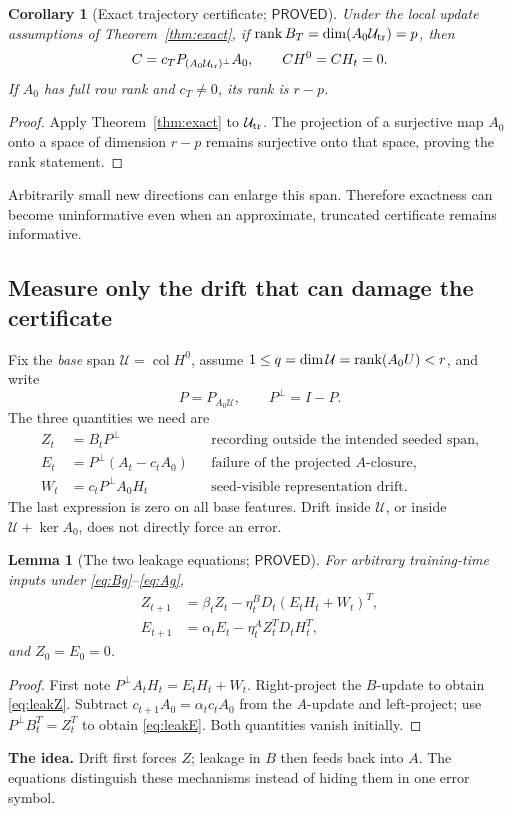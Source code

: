 \documentclass[12pt,a4paper]{article}
\theoremstyle{readable}
\newtheorem{lemma}[theorem]{Lemma}
\newtheorem{corollary}[theorem]{Corollary}
\theoremstyle{definition}\newtheorem{example}[theorem]{Example}
\newcommand{\col}{\operatorname{col}}\newcommand{\row}{\operatorname{row}}
\newcommand{\PP}{\mathsf{PROVED}}\newcommand{\FF}{\mathsf{FALSE}}
\newcommand{\idea}[1]{\par\textbf{The idea.} #1\par}
\begin{document}
\begin{corollary}[Exact trajectory certificate; \(\PP\)]\label{cor:trajectory}
Under the local update assumptions of Theorem~\ref{thm:exact}, if
\(\operatorname{rank} B_T=\dim(A_0\mathcal U_{\rm tr})=p\), then
\[
C=c_TP_{(A_0\mathcal U_{\rm tr})^\perp}A_0,
\qquad CH^0=CH_t=0.
\]
If \(A_0\) has full row rank and \(c_T\ne0\), its rank is \(r-p\).
\end{corollary}
\begin{proof}
Apply Theorem~\ref{thm:exact} to \(\mathcal U_{\rm tr}\). The projection of a surjective map \(A_0\) onto a space of dimension \(r-p\) remains surjective onto that space, proving the rank statement.
\end{proof}
Arbitrarily small new directions can enlarge this span. Therefore exactness can become uninformative even when an approximate, truncated certificate remains informative.

\subsection{Measure only the drift that can damage the certificate}
Fix the \emph{base} span \(\mathcal U=\col H^0\), assume \(1\le q=\dim\mathcal U=\operatorname{rank}(A_0U)<r\), and write
\[
P=P_{A_0\mathcal U},\qquad P^\perp=I-P.
\]
The three quantities we need are
\begin{align*}
Z_t&=B_tP^\perp &&\text{recording outside the intended seeded span},\\
E_t&=P^\perp(A_t-c_tA_0)&&\text{failure of the projected \(A\)-closure},\\
W_t&=c_tP^\perp A_0H_t&&\text{seed-visible representation drift}.
\end{align*}
The last expression is zero on all base features. Drift inside \(\mathcal U\), or inside \(\mathcal U+\ker A_0\), does not directly force an error.

\begin{lemma}[The two leakage equations; \(\PP\)]\label{lem:leak}
For arbitrary training-time inputs under \eqref{eq:Bg}--\eqref{eq:Ag},
\begin{align}
Z_{t+1}&=\beta_tZ_t-\eta_t^BD_t(E_tH_t+W_t)^T,\label{eq:leakZ}\\
E_{t+1}&=\alpha_tE_t-\eta_t^AZ_t^TD_tH_t^T,\label{eq:leakE}
\end{align}
and \(Z_0=E_0=0\).
\end{lemma}
\begin{proof}
First note \(P^\perp A_tH_t=E_tH_t+W_t\). Right-project the \(B\)-update to obtain \eqref{eq:leakZ}. Subtract \(c_{t+1}A_0=\alpha_tc_tA_0\) from the \(A\)-update and left-project; use \(P^\perp B_t^T=Z_t^T\) to obtain \eqref{eq:leakE}. Both quantities vanish initially.
\end{proof}
\idea{Drift first forces \(Z\); leakage in \(B\) then feeds back into \(A\). The equations distinguish these mechanisms instead of hiding them in one error symbol.}
\end{document}
